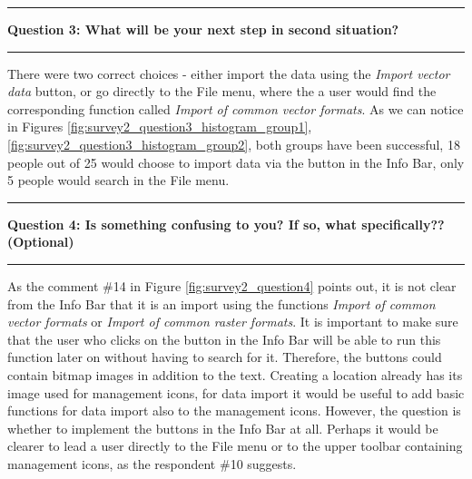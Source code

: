 \documentclass[a4paper,10pt,twoside]{article}
\begin{document}
\newpage
\vspace*{-1cm}
\par\noindent\rule{\textwidth}{0.4pt}
\noindent \textbf{Question 3: What will be your next step in second situation?}
\par\noindent\rule{\textwidth}{0.4pt}

\noindent There were two correct choices - either import the data using the \textit{Import vector data} button, or go directly to the File menu, where the a user would find the corresponding function called \textit{Import of common vector formats}. As we can notice in Figures \ref{fig:survey2_question3_histogram_group1}, \ref{fig:survey2_question3_histogram_group2}, both groups have been successful, 18 people out of 25 would choose to import data via the button in the Info Bar, only 5 people would search in the File menu.

\par\noindent\rule{\textwidth}{0.4pt}
\noindent \textbf{Question 4: Is something confusing to you? If so, what specifically?? (Optional)}
\par\noindent\rule{\textwidth}{0.4pt}

\noindent As the comment \#14 in Figure \ref{fig:survey2_question4} points out, it is not clear from the Info Bar that it is an import using the functions \textit{Import of common vector formats} or \textit{Import of common raster formats}.  It is important to make sure that the user who clicks on the button in the Info Bar will be able to run this function later on without having to search for it. Therefore, the buttons could contain bitmap images in addition to the text. Creating a location already has its image used for management icons, for data import it would be useful to add basic functions for data import also to the management icons. However, the question is whether to implement the buttons in the Info Bar at all. Perhaps it would be clearer to lead a user directly to the File menu or to the upper toolbar containing management icons, as the respondent \#10 suggests.
\end{document}
